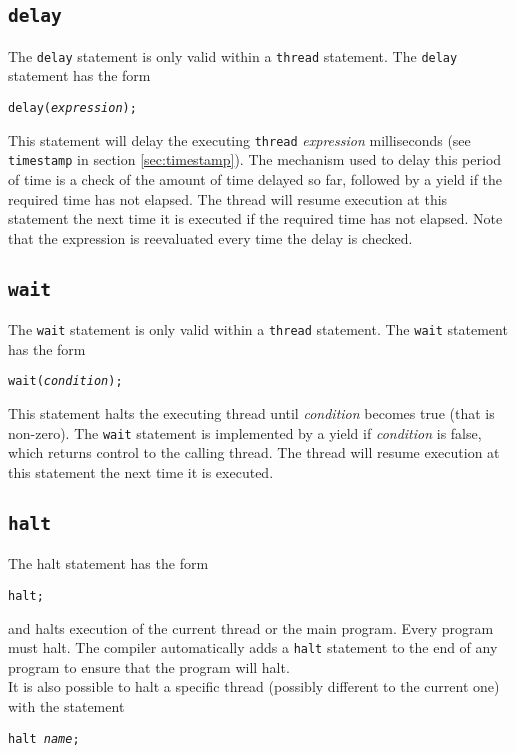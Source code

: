 \documentclass{article}
\begin{document}
\subsection{{\tt delay}}
\label{sec:delay}
The {\tt delay} statement is only valid within a
{\tt thread} statement. The {\tt delay} statement has the form
\begin{center}
	{\tt delay({\it expression});}
\end{center}
This statement will delay the executing {\tt thread} {\it expression} milliseconds 
(see {\tt timestamp} in section \ref{sec:timestamp}). The mechanism used
to delay this period of time is a check of the amount of time delayed so
far, followed by a yield if the required time has not elapsed.
The thread will resume execution at this statement the next time
it is executed if the required time has not elapsed. Note that
the expression is reevaluated every time the delay is checked.

\subsection{{\tt wait}}
The {\tt wait} statement is only valid within a
{\tt thread} statement. The {\tt wait} statement has
the form 
\begin{center}
	{\tt wait({\it condition});}
\end{center}
This statement halts the executing thread until {\it condition} becomes
true (that is non-zero). The {\tt wait} statement is implemented
by a yield if {\it condition} is false, which returns control to the
calling thread. The thread will resume execution at this statement
the next time it is executed.

\subsection{{\tt halt}}
The halt statement has the form
\begin{center}
	{\tt halt;}
\end{center}
and halts execution of the current thread or the main program.
Every program must halt. The compiler automatically adds a {\tt halt}
statement to the end of any program to ensure that the
program will halt.\\

It is also possible to halt a specific thread (possibly different to the current one) with
the statement
\begin{center}
	{\tt halt {\it name};}
\end{center}
\end{document}
